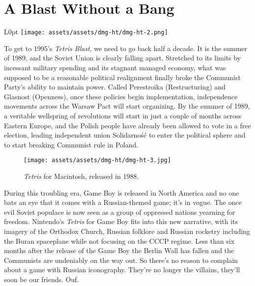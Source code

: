 \documentclass{book}
\begin{document}
\newpage\FloatBarrier\needspace{10mm}\section*{A Blast Without a Bang}\nopagebreak[4]
\begin{wrapfigure}{L}{0pt} \texttt{[image: assets/assets/dmg-ht/dmg-ht-2.png]}\end{wrapfigure}
To get to 1995’s \emph{Tetris Blast}, we need to go back half a decade. It is the summer of 1989, and the Soviet Union is clearly falling apart. Stretched to its limits by incessant military spending and its stagnant managed economy, what was supposed to be a reasonable political realignment finally broke the Communist Party’s ability to maintain power. Called Perestroika (Restructuring) and Glasnost (Openness), once these policies begin implementation, independence movements across the Warsaw Pact will start organizing. By the summer of 1989, a veritable wellspring of revolutions will start in just a couple of months across Eastern Europe, and the Polish people have already been allowed to vote in a free election, leading independent union Solidarność to enter the political sphere and to start breaking Communist rule in Poland.

\begin{figure}[hbt]
\vskip 10pt
\centering \texttt{[image: assets/assets/dmg-ht/dmg-ht-3.jpg]}\par\pagetwodescription \emph{Tetris} for Macintosh, released in 1988.
\vskip 6pt
\end{figure}

During this troubling era, Game Boy is released in North America and no one bats an eye that it comes with a Russian-themed game; it’s in vogue. The once evil Soviet populace is now seen as a group of oppressed nations yearning for freedom. Nintendo’s \emph{Tetris} for Game Boy fits into this new narrative, with its imagery of the Orthodox Church, Russian folklore and Russian rocketry including the Buran spaceplane while not focusing on the CCCP regime. Less than six months after the release of the Game Boy the Berlin Wall has fallen and the Communists are undeniably on the way out. So there’s no reason to complain about a game with Russian iconography. They’re no longer the villains, they’ll soon be our friends. Ouf.
\end{document}
